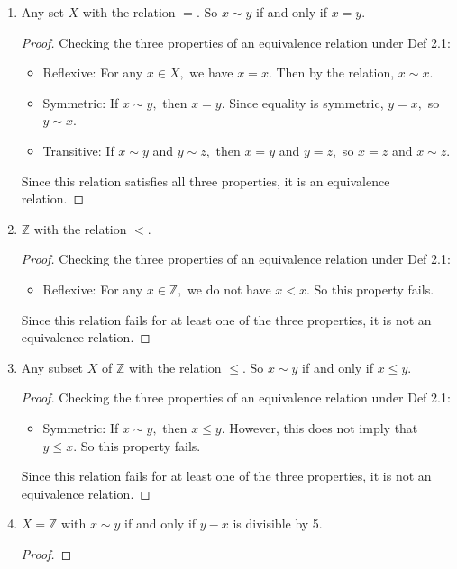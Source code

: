 \documentclass[11pt]{article}
\begin{document}
\begin{enumerate}[label=(\alph*)]
    \item Any set $X$ with the relation $=.$ So $x\sim y$ if and only if $x=y.$
    \begin{proof}
        Checking the three properties of an equivalence relation under Def 2.1:
        \begin{itemize}
            \item Reflexive: For any $x\in X,$ we have $x=x$. Then by the relation, $x\sim x.$
            \item Symmetric: If $x\sim y,$ then $x=y.$ Since equality is symmetric, $y=x,$ so $y\sim x.$
            \item Transitive: If $x\sim y$ and $y\sim z,$ then $x=y$ and $y=z,$ so $x=z$ and $x\sim z.$ 
        \end{itemize}
        Since this relation satisfies all three properties, it is an equivalence relation.
    \end{proof}
    \item $\mathbb{Z}$ with the relation $<.$ 
    \begin{proof}
        Checking the three properties of an equivalence relation under Def 2.1:
        \begin{itemize}
            \item Reflexive: For any $x\in \mathbb{Z},$ we do not have $x<x.$ So this property fails.
        \end{itemize}
        Since this relation fails for at least one of the three properties, it is not an equivalence relation. 
    \end{proof}
    \item Any subset $X $ of $\mathbb{Z}$ with the relation $\leq.$ So $x\sim y$ if and only if $x\leq y.$ 
    \begin{proof}
        Checking the three properties of an equivalence relation under Def 2.1:
        \begin{itemize}
            \item Symmetric: If $x\sim y,$ then $x\leq y.$ However, this does not imply that $y\leq x.$ So this property fails.
        \end{itemize}
        Since this relation fails for at least one of the three properties, it is not an equivalence relation.
    \end{proof}
    \item $X=\mathbb{Z}$ with $x\sim y$ if and only if $y-x$ is divisible by 5.
    \begin{proof}

\end{proof}
\end{enumerate}
\end{document}
